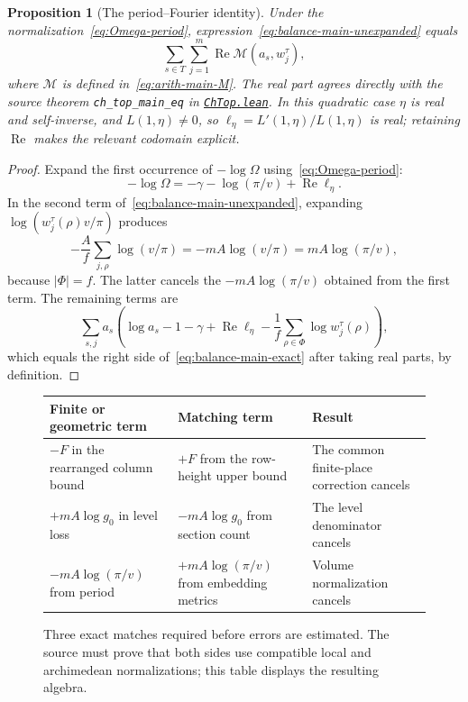 \documentclass[11pt,openany,oneside]{scrbook}
\newtheorem{proposition}[theorem]{Proposition}
\theoremstyle{definition}
\theoremstyle{remark}
\newcommand{\Rea}{\operatorname{Re}}
\newcommand{\baseurl}{https://github.com/CocoSgt/riemann-hypothesis-lean/blob/7cbf7a0c32fca1badf05931879a37c3f8a2b03b4/}
\newcommand{\sourcefile}[2]{\href{\baseurl#1}{\texttt{#2}}}
\begin{document}
\begin{proposition}[The period--Fourier identity]\label{prop:period-balance}
Under the normalization~\eqref{eq:Omega-period}, expression~\eqref{eq:balance-main-unexpanded} equals
\begin{equation}\label{eq:balance-main-exact}
\sum_{s\in T}\sum_{j=1}^m\Rea\mathcal M(a_s,w_j^\tau),
\end{equation}
where $\mathcal M$ is defined in~\eqref{eq:arith-main-M}.  The real part agrees directly with the source theorem \texttt{ch\_top\_main\_eq} in \sourcefile{src/Development/AutomorphicArithmetic/DedekindLFunctions/LandauTheorems/ChTop.lean}{ChTop.lean}.  In this quadratic case $\eta$ is real and self-inverse, and $L(1,\eta)\ne0$, so $\ell_\eta=L'(1,\eta)/L(1,\eta)$ is real; retaining $\Rea$ makes the relevant codomain explicit.
\end{proposition}
\begin{proof}
Expand the first occurrence of $-\log\Omega$ using~\eqref{eq:Omega-period}:
\[
-\log\Omega=-\gamma-\log(\pi/v)+\Rea\ell_\eta.
\]
In the second term of~\eqref{eq:balance-main-unexpanded}, expanding $\log(w_j^\tau(\rho)v/\pi)$ produces
\[
-\frac Af\sum_{j,\rho}\log(v/\pi)=-mA\log(v/\pi)=mA\log(\pi/v),
\]
because $|\Phi|=f$.  The latter cancels the $-mA\log(\pi/v)$ obtained from the first term.  The remaining terms are
\[
\sum_{s,j}a_s\left(\log a_s-1-\gamma+\Rea\ell_\eta
-\frac1f\sum_{\rho\in\Phi}\log w_j^\tau(\rho)\right),
\]
which equals the right side of~\eqref{eq:balance-main-exact} after taking real parts, by definition.
\end{proof}

\begin{figure}[ht]
\centering
\renewcommand{\arraystretch}{1.27}
\begin{tabularx}{\linewidth}{@{}>{\raggedright\arraybackslash}p{.32\linewidth}>{\raggedright\arraybackslash}p{.32\linewidth}X@{}}
\toprule
\textbf{Finite or geometric term}&\textbf{Matching term}&\textbf{Result}\\\midrule
$-F$ in the rearranged column bound&$+F$ from the row-height upper bound&The common finite-place correction cancels\\
$+mA\log g_0$ in level loss&$-mA\log g_0$ from section count&The level denominator cancels\\
$-mA\log(\pi/v)$ from period&$+mA\log(\pi/v)$ from embedding metrics&Volume normalization cancels\\\bottomrule
\end{tabularx}
\caption{Three exact matches required before errors are estimated.  The source must prove that both sides use compatible local and archimedean normalizations; this table displays the resulting algebra.}
\label{fig:three-cancellations}
\end{figure}
\end{document}
